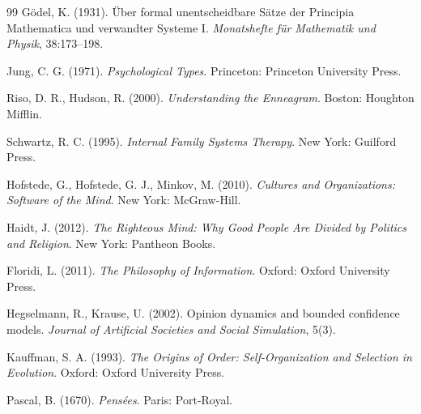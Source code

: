 \documentclass[11pt,a4paper]{article}
\theoremstyle{definition}
\theoremstyle{remark}
\begin{document}
\begin{thebibliography}{99}
Gödel, K. (1931). Über formal unentscheidbare Sätze der Principia Mathematica und verwandter Systeme I. \textit{Monatshefte für Mathematik und Physik}, 38:173–198.

Jung, C. G. (1971). \textit{Psychological Types}. Princeton: Princeton University Press.

Riso, D. R., Hudson, R. (2000). \textit{Understanding the Enneagram}. Boston: Houghton Mifflin.

Schwartz, R. C. (1995). \textit{Internal Family Systems Therapy}. New York: Guilford Press.

Hofstede, G., Hofstede, G. J., Minkov, M. (2010). \textit{Cultures and Organizations: Software of the Mind}. New York: McGraw-Hill.

Haidt, J. (2012). \textit{The Righteous Mind: Why Good People Are Divided by Politics and Religion}. New York: Pantheon Books.

Floridi, L. (2011). \textit{The Philosophy of Information}. Oxford: Oxford University Press.

Hegselmann, R., Krause, U. (2002). Opinion dynamics and bounded confidence models. \textit{Journal of Artificial Societies and Social Simulation}, 5(3).

Kauffman, S. A. (1993). \textit{The Origins of Order: Self-Organization and Selection in Evolution}. Oxford: Oxford University Press.

Pascal, B. (1670). \textit{Pensées}. Paris: Port-Royal.

\end{thebibliography}
\end{document}
